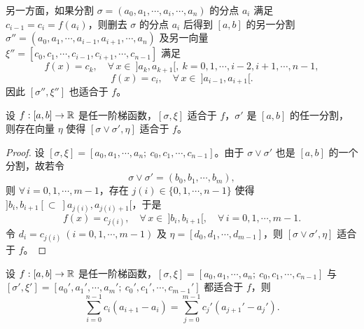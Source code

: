 另一方面，如果分割 \(\sigma=(a_0,a_1,\cdots,a_i,\cdots,a_n)\) 的分点 \(a_i\) 满足 \(c_{i-1}=c_i=f(a_i)\)，则删去 \(\sigma\) 的分点 \(a_i\) 后得到 \([a,b]\) 的另一分割 \(\sigma''=(a_0,a_1,\cdots,a_{i-1},a_{i+1},\cdots,a_n)\) 及另一向量 \(\xi''=[c_0,c_1,\cdots,c_{i-1},c_{i+1},\cdots,c_{n-1}]\) 满足
\[
f(x)=c_k,\quad \forall\,x\in\ ]a_k,a_{k+1}[,\ k=0,1,\cdots,i-2,i+1,\cdots,n-1,
\]
\[
f(x)=c_i,\quad \forall\,x\in\ ]a_{i-1},a_{i+1}[.
\]
因此 \([\sigma'',\xi'']\) 也适合于 \(f\)。

\begin{mylemma*}{}

	设 \(f:[a,b]\to\mathbb{R}\) 是任一阶梯函数，\([\sigma,\xi]\) 适合于 \(f\)，\(\sigma'\) 是 \([a,b]\) 的任一分割，则存在向量 \(\eta\) 使得 \([\sigma\vee\sigma',\eta]\) 适合于 \(f\)。

\end{mylemma*}

\begin{proof}

	设 \([\sigma,\xi]=[a_0,a_1,\cdots,a_n;\ c_0,c_1,\cdots,c_{n-1}]\)。由于 \(\sigma\vee\sigma'\) 也是 \([a,b]\) 的一个分割，故若令
	\[
	\sigma\vee\sigma'=(b_0,b_1,\cdots,b_m),
	\]
	则 \(\forall\,i=0,1,\cdots,m-1\)，存在 \(j(i)\in\{0,1,\cdots,n-1\}\) 使得 \(]b_i,b_{i+1}[\subset\ ]a_{j(i)},a_{j(i)+1}[\)，于是
	\[
	f(x)=c_{j(i)},\quad \forall\,x\in\ ]b_i,b_{i+1}[,\quad \forall\,i=0,1,\cdots,m-1.
	\]
	令 \(d_i=c_{j(i)}\ (i=0,1,\cdots,m-1)\) 及 \(\eta=[d_0,d_1,\cdots,d_{m-1}]\)，则 \([\sigma\vee\sigma',\eta]\) 适合于 \(f\)。

\end{proof}

\begin{myprop*}{}

	设 \(f:[a,b]\to\mathbb{R}\) 是任一阶梯函数，\([\sigma,\xi]=[a_0,a_1,\cdots,a_n;\ c_0,c_1,\cdots,c_{n-1}]\) 与 \([\sigma',\xi']=[a_0',a_1',\cdots,a_m';\ c_0',c_1',\cdots,c_{m-1}']\) 都适合于 \(f\)，则
	\[
	\sum_{i=0}^{n-1}c_i(a_{i+1}-a_i)=\sum_{j=0}^{m-1}c_j'(a_{j+1}'-a_j').
	\]

\end{myprop*}

